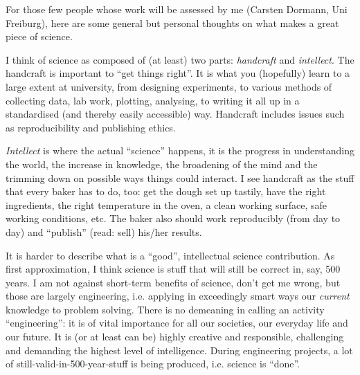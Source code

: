%

\bigskip
\noindent For those few people whose work will be assessed by me (Carsten Dormann, Uni Freiburg), here are some general but personal thoughts on what makes a great piece of science.

I think of science as composed of (at least) two parts: \emph{handcraft} and \emph{intellect}. The handcraft is important to ``get things right''. It is what you (hopefully) learn to a large extent at university, from designing experiments, to various methods of collecting data, lab work, plotting, analysing, to writing it all up in a standardised (and thereby easily accessible) way. Handcraft includes issues such as reproducibility and publishing ethics.

\emph{Intellect} is where the actual ``science'' happens, it is the progress in understanding the world, the increase in knowledge, the broadening of the mind and the trimming down on possible ways things could interact. I see handcraft as the stuff that every baker has to do, too: get the dough set up tastily, have the right ingredients, the right temperature in the oven, a clean working surface, safe working conditions, etc. The baker also should work reproducibly (from day to day) and ``publish'' (read: sell) his/her results.

It is harder to describe what is a ``good'', intellectual science contribution. As first approximation, I think science is stuff that will still be correct in, say, 500 years. I am not against short-term benefits of science, don't get me wrong, but those are largely engineering, i.e. applying in exceedingly smart ways our \emph{current} knowledge to problem solving. There is no demeaning in calling an activity ``engineering'': it is of vital importance for all our societies, our everyday life and our future. It is (or at least can be) highly creative and responsible, challenging and demanding the highest level of intelligence. During engineering projects, a lot of still-valid-in-500-year-stuff is being produced, i.e. science is ``done''. 

